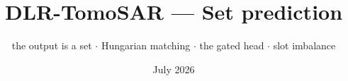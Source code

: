 \documentclass[aspectratio=169,9pt]{beamer}
\title{\textbf{DLR-TomoSAR --- Set prediction}}
\subtitle{the output is a set \; $\cdot$ \; Hungarian matching \; $\cdot$ \; the gated head \; $\cdot$ \; slot imbalance}
\date{\small July 2026}
\author{}
\begin{document}
\begin{frame}[plain]
  \titlepage
\end{frame}


\end{document}
